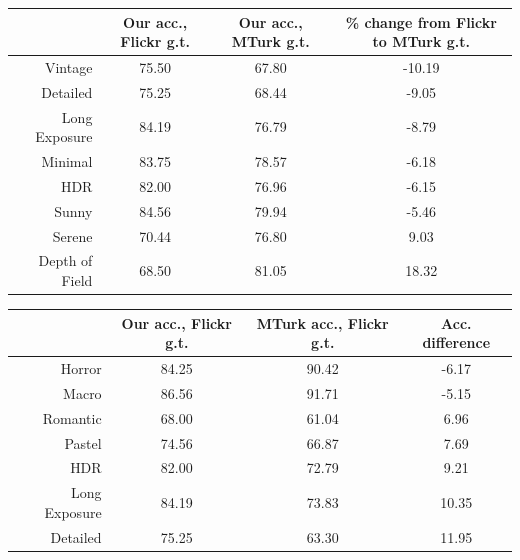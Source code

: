 \begin{table}[ht!]
{\vfill

\begin{tabular}{rccc}
\toprule
{}                    & Our acc., Flickr g.t.   & Our acc., MTurk g.t.  & \% change from Flickr to MTurk g.t. \\
\midrule
Vintage               & 75.50                       & 67.80                     & -10.19 \\
Detailed              & 75.25                       & 68.44                     & -9.05 \\
Long Exposure         & 84.19                       & 76.79                     & -8.79 \\
Minimal               & 83.75                       & 78.57                     & -6.18 \\
HDR                   & 82.00                       & 76.96                     & -6.15 \\
Sunny                 & 84.56                       & 79.94                     & -5.46 \\
Serene                & 70.44                       & 76.80                     & 9.03 \\
Depth of Field        & 68.50                       & 81.05                     & 18.32 \\
\end{tabular}

\vfill

\begin{tabular}{rccc}
\toprule
{}                     & Our acc., Flickr g.t. & MTurk acc., Flickr g.t. & Acc. difference \\
\midrule
Horror                 & 84.25                     & 90.42                       & -6.17 \\
Macro                  & 86.56                     & 91.71                       & -5.15 \\
Romantic               & 68.00                     & 61.04                       & 6.96 \\
Pastel                 & 74.56                     & 66.87                       & 7.69 \\
HDR                    & 82.00                     & 72.79                       & 9.21 \\
Long Exposure          & 84.19                     & 73.83                       & 10.35 \\
Detailed               & 75.25                     & 63.30                       & 11.95 \\
\end{tabular}

}
\end{table}

